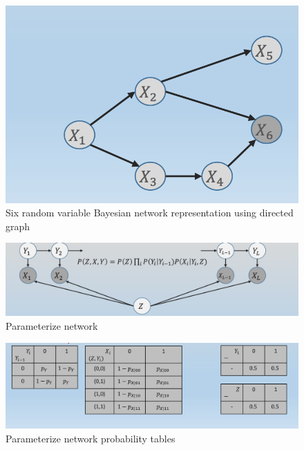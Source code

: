 \documentclass{article}
\begin{document}
\begin{enumerate}
    \begin{figure}[bp]
            \includegraphics[width=\textwidth]{img/small_network.png}
            \centering
            \caption{Six random variable Bayesian network representation using directed graph}
            \label{fig:simple_network}
        \end{figure}

        \begin{figure}[bp]
            \includegraphics[width=\textwidth]{img/iterative_network.png}
            \centering
            \caption{Parameterize network}
            \label{fig:parameterized_network}
        \end{figure}
        \begin{figure}[bp]
            \includegraphics[width=\textwidth]{img/parameterize_network_description.png}
            \centering
            \caption{Parameterize network probability tables}
            \label{fig:parameterize_network_description}
        \end{figure}
    \end{enumerate}

    
\end{document}
